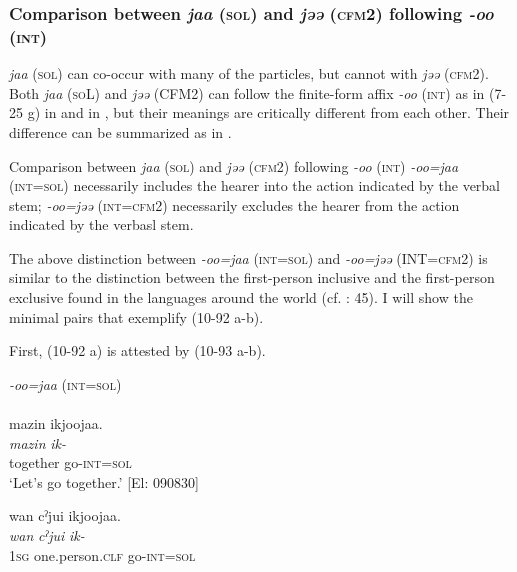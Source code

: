 \subsubsection{Comparison between \textit{jaa} (\textsc{sol}) and \textit{jəə} (\textsc{cfm}2) following \textit{{}-oo} (\textsc{int})}\label{sec:10.5.2.2}

\textit{jaa} (\textsc{sol}) can co-occur with many of the particles, but cannot with \textit{jəə} (\textsc{cfm}2). Both \textit{jaa} (\textsc{so}L) and \textit{jəə} (CFM2) can follow the finite-form affix \textit{-oo} (\textsc{int}) as in (7-25 g) in  and  in , but their meanings are critically different from each other. Their difference can be summarized as in .

\ea\label{ex:10.92}
Comparison between \textit{jaa} (\textsc{sol}) and \textit{jəə} (\textsc{cfm}2) following \textit{{}-oo} (\textsc{int})
  \ea \textit{{}-oo=jaa} (\textsc{int}=\textsc{sol}) necessarily includes the hearer into the action indicated by the verbal stem;
  \ex \textit{{}-oo=jəə} (\textsc{int}=\textsc{cfm}2) necessarily excludes the hearer from the action indicated by the verbasl stem.
  \z
\z

The above distinction between \textit{{}-oo=jaa} (\textsc{int}=\textsc{sol}) and \textit{{}-oo=jəə} (INT=\textsc{cfm}2) is similar to the distinction between the first-person inclusive and the first-person exclusive found in the languages around the world (cf. \citealt{Payne1997}: 45). I will show the minimal pairs that exemplify (10-92 a-b).

First, (10-92 a) is attested by (10-93 a-b).

\ea\label{ex:10.93}   \textit{{}-oo=jaa} (\textsc{int}=\textsc{sol})\\
  \ea{}\\
      \glll     mazin  ikjoojaa.\\
       \textit{mazin}  \textit{ik-}\\
       together  go-\textsc{int}=\textsc{sol}\\
      \glt       ‘Let’s go together.’ [El: 090830]

  \ex  %
      \glll    *wan  cˀjui  ikjoojaa.\\
       \textit{wan}  \textit{cˀjui}  \textit{ik-}\\
       1\textsc{sg}  one.person.\textsc{clf}  go-\textsc{int}=\textsc{sol}\\
       \glt    [El: 090830]
    \z
\z

